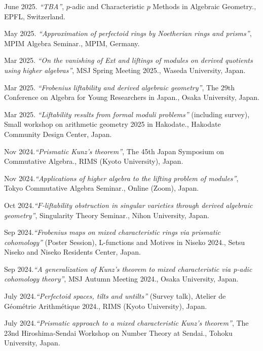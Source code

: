 \documentclass[10pt,a4paper,sans]{moderncv}
\begin{document}
\begin{etaremune}
  \item June 2025. \emph{``TBA''}, \textsf{$p$-adic and Characteristic \(p\) Methods in Algebraic Geometry.}, EPFL, Switzerland.
  \item May 2025. \emph{``Approximation of perfectoid rings by Noetherian rings and prisms''}, \textsf{MPIM Algebra Seminar.}, MPIM, Germany.
  \item Mar 2025. \emph{``On the vanishing of Ext and liftings of modules on derived quotients using higher algebras''}, \textsf{MSJ Spring Meeting 2025.}, Waseda University, Japan.
  \item Mar 2025. \emph{``Frobenius liftability and derived algebraic geometry''}, \textsf{The 29th Conference on Algebra for Young Researchers in Japan.}, Osaka University, Japan.
  \item Mar 2025. \emph{``Liftability results from formal moduli problems''} (including survey), \textsf{Small workshop on arithmetic geometry 2025 in Hakodate.}, Hakodate Community Design Center, Japan.
  \item Nov 2024.\emph{``Prismatic Kunz's theorem''}, \textsf{The 45th Japan Symposium on Commutative Algebra.}, RIMS (Kyoto University), Japan.
  \item Nov 2024.\emph{``Applications of higher algebra to the lifting problem of modules''}, \textsf{Tokyo Commutative Algebra Seminar.}, Online (Zoom), Japan.
  \item Oct 2024.\emph{``\(F\)-liftability obstruction in singular varieties through derived algebraic geometry''}, \textsf{Singularity Theory Seminar.}, Nihon University, Japan.
  \item Sep 2024.\emph{``Frobenius maps on mixed characteristic rings via prismatic cohomology''} (Poster Session), \textsf{L-functions and Motives in Niseko 2024.}, Setsu Niseko and Niseko Residents Center, Japan.
  \item Sep 2024.\emph{``A generalization of Kunz's theorem to mixed characteristic via p-adic cohomology theory''}, \textsf{MSJ Autumn Meeting 2024.}, Osaka University, Japan.
  \item July 2024.\emph{``Perfectoid spaces, tilts and untilts''} (Survey talk), \textsf{Atelier de Géométrie Arithmétique 2024.}, RIMS (Kyoto University), Japan.
  \item July 2024.\emph{``Prismatic approach to a mixed characteristic Kunz's theorem''}, \textsf{The 23nd Hiroshima-Sendai Workshop on Number Theory at Sendai.}, Tohoku University, Japan.

\end{etaremune}
\end{document}
